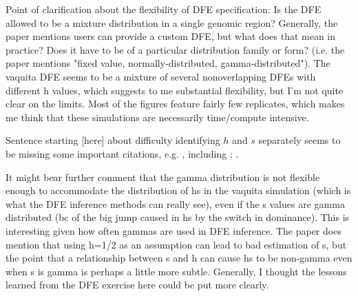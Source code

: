   \begin{point}{}
    Point of clarification about the flexibility of DFE specification: Is the DFE allowed to be a mixture distribution in a single genomic region? 
    Generally, the paper mentions users can provide a custom DFE, but what does that mean in practice? Does it have to be of a particular distribution family or form? 
    (i.e. the paper mentions "fixed value, normally-distributed, gamma-distributed"). 
    The vaquita DFE seems to be a mixture of several nonoverlapping DFEs with different h values, which suggests to me substantial flexibility, 
    but I'm not quite clear on the limits. Most of the figures feature fairly few replicates, which makes me think that these simulations are necessarily time/compute intensive.
  \end{point}
  

  \begin{point}{\revref}
      Sentence starting [here] %
      about difficulty identifying $h$ and $s$ separately seems to be missing some important citations, 
      e.g. \textcite{fuller2019measuring}, %
      including 
      \textcite{simons2014deleterious}; %
      \textcite{wright1937distribution}. %
  \end{point}
  

  \begin{point}{}
    It might bear further comment that the gamma distribution is not flexible enough to accommodate the distribution of hs in the vaquita simulation 
    (which is what the DFE inference methods can really see), even if the s values are gamma distributed (bc of the big jump caused in hs by the switch in dominance). 
    This is interesting given how often gammas are used in DFE inference. The paper does mention that using h=1/2 as an assumption can lead to bad estimation of s, 
    but the point that a relationship between s and h can cause hs to be non-gamma even when s is gamma is perhaps a little more subtle. 
    Generally, I thought the lessons learned from the DFE exercise here could be put more clearly.
  \end{point}
  
